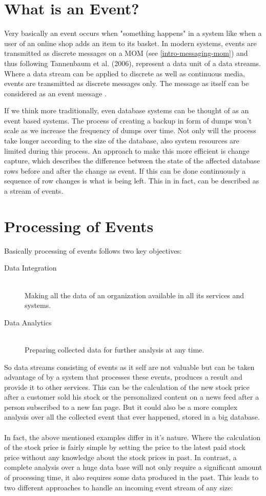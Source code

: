 \section{What is an Event?}
\label{intro-datastream-datastream}
Very basically an event occurs when "something happens"  in a system like when a
user of an online shop adds an item to its basket. In modern systems, events are
transmitted as discrete messages on a MOM (see \ref{intro-messaging-mom}) and
thus following Tannenbaum et al. (2006), represent a data unit of a data
streams. Where a data stream can be applied to discrete as well as continuous
media, events are transmitted as discrete messages only. The message as itself
can be considered as an event message \cite{EIP03}.

If we think more traditionally, even database systems can be thought of as an
event based systems. The process of creating a backup in form of dumps won't
scale as we increase the frequency of dumps over time. Not only will the process
take longer according to the size of the database, also system resources are
limited during this process. An approach to make this more efficient 
is change capture, which describes the difference between the state of the
affected database rows before and after the change as event. If this can be done
continuously a sequence of row changes is what is being left. This in in fact,
can be described as a stream of events.

\section{Processing of Events}
Basically processing of events follows two key objectives: 
\begin{description}
    \item [Data Integration] \hfill \\ Making all the data of an organization available in all its services and systems.
    \item [Data Analytics]  \hfill \\ Preparing collected data for further analysis at any time. 
\end{description}

So data streams consisting of events as it self are not valuable but
can be taken advantage of by a system that processes these events, produces a
result and provide it to other services. This can be the calculation of the new
stock price after a customer sold his stock or the personalized content on a
news feed after a person subscribed to a new fan page. But it could also be a
more complex analysis over all the collected event that ever happened, stored in
a big database. 
\\ \\
In fact, the above mentioned examples differ in it's nature. Where the
calculation of the stock price is fairly simple by setting the price to the
latest paid stock price without any knowledge about the stock prices in past. 
In contrast, a complete analysis over a huge data base will not only require a
significant amount of processing time, it also requires some data produced in the
past. This leads to two different approaches to handle an incoming event stream
of any size: 

